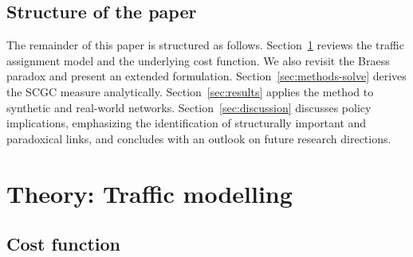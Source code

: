 \documentclass[twocolumn,english,groupedaddress, superscriptaddress,aps,pre,10pt,floatfix]{revtex4-2}
\begin{document}
\subsection{Structure of the paper}

The remainder of this paper is structured as follows. Section~\ref{sec:model} reviews the traffic assignment model and the underlying cost function. We also revisit the Braess paradox and present an extended formulation. Section~\ref{sec:methods-solve} derives the SCGC measure analytically. Section~\ref{sec:results} applies the method to synthetic and real-world networks. Section~\ref{sec:discussion} discusses policy implications, emphasizing the identification of structurally important and paradoxical links, and concludes with an outlook on future research directions.

%




\section{Theory: Traffic modelling}\label{sec:model}

\subsection{Cost function}
\end{document}
